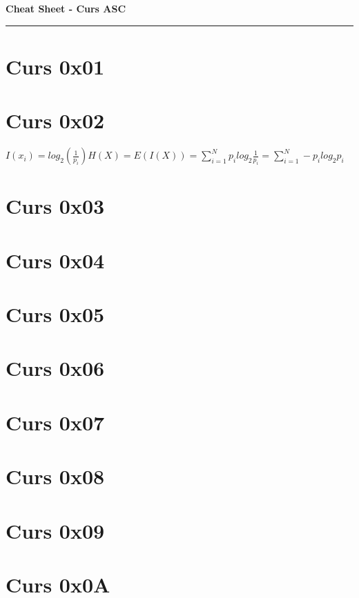 \documentclass[a4paper]{article}
\newenvironment{definition}[1]
    {\par\noindent\begin{tcolorbox}[colback=blue!5!white,colframe=blue!75!black,title=#1,fonttitle=\bfseries,boxsep=1mm,left=1mm,right=1mm,top=1mm,bottom=1mm]}
    {\end{tcolorbox}}
\newcommand{\smallection}[1]{\section{\small #1}}
\begin{document}
\noindent
\textbf{\small Cheat Sheet - Curs ASC}
\vspace{0.15ex}
\hrule
\vspace{0.55ex}

\pagestyle{empty}
\footnotesize

\smallection{ Curs 0x01}

\smallection{Curs 0x02}
$I(x_i) = log_2(\frac{1}{p_i}) H(X) = E(I(X)) = \sum_{i = 1}^{N}p_i log_2\frac{1}{p_i} = \sum_{i = 1}^{N} - p_i log_2 p_i$


\smallection{Curs 0x03}

\smallection{Curs 0x04}

\smallection{Curs 0x05}

\smallection{Curs 0x06}

\smallection{Curs 0x07}

\smallection{Curs 0x08}

\smallection{Curs 0x09}

\smallection{Curs 0x0A}

\begin{multicols}{2}




\end{multicols}
\end{document}
